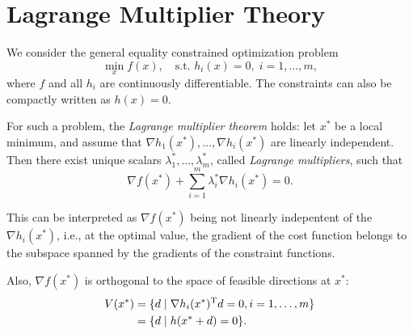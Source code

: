 \documentclass{article}
\begin{document}
\section{Lagrange Multiplier Theory}

\label{s:lagrange-equality}

We consider the general equality constrained optimization problem
\begin{equation*}
  \min_x f(x), \quad\text{s.t. } h_i(x) = 0, \; i = 1, \dots, m,
\end{equation*}
where \(f\) and all \(h_i\) are continuously differentiable.  The constraints can also be compactly
written as \(h(x) = 0\). 

For such a problem, the \emph{Lagrange multiplier theorem} holds: let \(x^*\) be a local minimum,
and assume that \(\nabla h_1(x^*), \dots, \nabla h_i(x^*)\) are linearly independent.  Then there
exist unique scalars \(\lambda^*_1, \dots, \lambda^*_m\), called \emph{Lagrange multipliers}, such
that
\begin{equation*}
  \nabla f(x^*) + \sum_{i=1}^m \lambda^*_i \nabla h_i(x^*) = 0.
\end{equation*}

This can be interpreted as \(\nabla f(x^*)\) being not linearly indepentent of the
\(\nabla h_i(x^*)\), i.e., at the optimal value, the gradient of the cost function belongs to the
subspace spanned by the gradients of the constraint functions.

Also, \(\nabla f(x^*)\) is orthogonal to the space of feasible directions at \(x^*\):
\begin{align*}
  V(x^*) &= \{d \mid \nabla h_i(x^*)^{\mathrm{T}} d = 0, i = 1, \dots, m\} \\
         &= \{d \mid h(x^* + d) = 0\}.
\end{align*}



\end{document}

